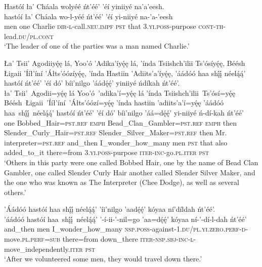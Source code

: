 \ea\label{ex:text3-1-3}
Hastóí ła’ Cháala wolyéé ńt’éé’ ’éí yiniiyé na’a’eesh.\\
\gll hastóí	ła’	Cháala	wo-l-yéé	ńt’éé’	’éí	yi-niiyé	na-’a-’eesh\\
     men	one	Charlie	\textsc{dir}-\textsc{l}-call.\textsc{neu}.\textsc{impf}	\textsc{pst}	that	3.\textsc{yi}.\textsc{poss}-purpose	\textsc{cont}-\textsc{th}-lead.\textsc{du}/\textsc{pl}.\textsc{cont}\\
\glt `The leader of one of the parties was a man named Charlie.'
\z

\ea\label{ex:text3-1-4}
Ła’ Tsii’ Agodiiyę́ę lá, Yoo’ó ’Adika’íyę́ę lá, ’índa Tsiishch’ilii Ts’ósíyę́ę, Béésh Łigaii ’Ííł’íní ’Áłts’óózíyę́ę, ’índa Hastiin ’Adiits’a’íyę́ę, ’áádóó haa shį́į́ néelą́ą́’ hastóí ńt’éé’ ’éí dó’ bíi’nilgo ’áádę́ę́’ yiniiyé ńdíkah ńt’éé’.\\
\gll ła’	Tsii’~{Agodii=yę́ę}	lá	Yoo’ó~{’adika’í=yę́ę}	lá	’índa	Tsiishch’ilii~{Ts’ósí=yę́ę}	Béésh~Łigaii~’Ííł’íní~{’Áłts’óózí=yę́ę}	’índa	hastiin	’adiits’a’í=yę́ę	’áádóó	haa~shį́į́~{néelą́ą́’}	hastóí	ńt’éé’	’éí	dó’	bíi’nilgo	’áá=dę́ę́’	yi-niiyé	ń-dí-kah	ńt’éé’\\
     one	Bobbed\_Hair=\textsc{pst}.\textsc{ref}	\textsc{emph}	Bead\_Clan\_Gambler=\textsc{pst}.\textsc{ref}	\textsc{emph}	then	Slender\_Curly\_Hair=\textsc{pst}.\textsc{ref}	Slender\_Silver\_Maker=\textsc{pst}.\textsc{ref}	then	Mr.	interpreter=\textsc{pst}.\textsc{ref}	and\_then	I\_wonder\_how\_many	men	\textsc{pst}	that	also	added\_to\_it	there=from	3.\textsc{yi}.\textsc{poss}-purpose	\textsc{iter}-\textsc{inc}-go.\textsc{pl}.\textsc{iter}	\textsc{pst}\\
\glt `Others in this party were one called Bobbed Hair, one by the name of Bead Clan Gambler, one called Slender Curly Hair another called Slender Silver Maker, and the one who was known as The Interpreter (Chee Dodge), as well as several others.'
\z

\ea\label{ex:text3-1-5}
’Áádóó hastóí haa shį́į́ néelą́ą́’ ’íi’nilgo ’aadę́ę́’ kóyaa ní’díldah ńt’éé’.\\
\gll ’áádóó	hastóí	haa~shį́į́~{néelą́ą́’}	’-í-ii-’-nil=go	’aa=dę́ę́’	kóyaa	ní-’-dí-l-dah	ńt’éé’\\
     and\_then	men	I\_wonder\_how\_many	\textsc{nsp}.\textsc{poss}-against-1.\textsc{du}/\textsc{pl}.\textsc{yi}.\textsc{zero}.\textsc{perf}-\textsc{d}-move.\textsc{pl}.\textsc{perf}=\textsc{sub}	there=from	down\_there	\textsc{iter}-\textsc{nsp}.\textsc{sbj}-\textsc{inc}-\textsc{l}-move\_independently.\textsc{iter}	\textsc{pst}\\
\glt `After we volunteered some men, they would travel down there.'
\z

